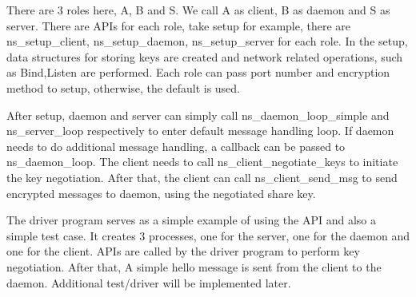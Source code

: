 There are 3 roles here, A, B and S. We call A as client, B as daemon and S as server. There are A\-P\-Is for each role, take setup for example, there are ns\-\_\-setup\-\_\-client, ns\-\_\-setup\-\_\-daemon, ns\-\_\-setup\-\_\-server for each role. In the setup, data structures for storing keys are created and network related operations, such as Bind,Listen are performed. Each role can pass port number and encryption method to setup, otherwise, the default is used.\par
 After setup, daemon and server can simply call ns\-\_\-daemon\-\_\-loop\-\_\-simple and ns\-\_\-server\-\_\-loop respectively to enter default message handling loop. If daemon needs to do additional message handling, a callback can be passed to ns\-\_\-daemon\-\_\-loop. The client needs to call ns\-\_\-client\-\_\-negotiate\-\_\-keys to initiate the key negotiation. After that, the client can call ns\-\_\-client\-\_\-send\-\_\-msg to send encrypted messages to daemon, using the negotiated share key.\par
 The driver program serves as a simple example of using the A\-P\-I and also a simple test case. It creates 3 processes, one for the server, one for the daemon and one for the client. A\-P\-Is are called by the driver program to perform key negotiation. After that, A simple hello message is sent from the client to the daemon. Additional test/driver will be implemented later. 